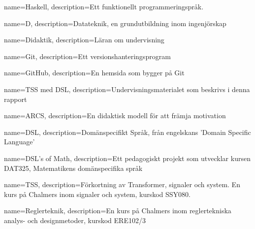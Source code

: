 
{
	name=Haskell,
	description={Ett funktionellt programmeringspråk.}
}

{
    name=D,
    description={Datateknik, en grundutbildning inom ingenjörskap}
}

{
    name=Didaktik,
    description={Läran om undervisning}
}

{
    name=Git,
    description={Ett versionshanteringsprogram}
}

{
    name=GitHub,
    description={En hemsida som bygger på Git}
}

{
    name={TSS med DSL},
    description={Undervisningsmaterialet som beskrivs i denna rapport}
}

{
    name=ARCS,
    description={En didaktisk modell för att främja motivation}
}

{
    name=DSL,
    description={Domänspecifikt Språk, från engelskans 'Domain Specific Language'}
}

{
    name={DSL's of Math},
    description={Ett pedagogiskt projekt som utvecklar kursen DAT325, Matematikens domänspecifika språk}
}

{
    name={TSS},
    description={Förkortning av Transformer, signaler och system. En kurs på Chalmers inom signaler och system, kurskod SSY080. }
}

{
    name={Reglerteknik},
    description={En kurs på Chalmers inom reglertekniska analys- och designmetoder, kurskod ERE102/3}
}







